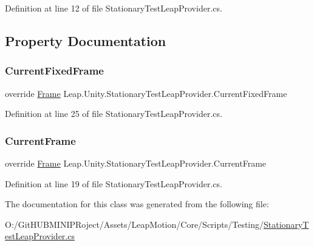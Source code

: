 Definition at line 12 of file Stationary\+Test\+Leap\+Provider.\+cs.



\subsection{Property Documentation}
\mbox{\label{class_leap_1_1_unity_1_1_stationary_test_leap_provider_ad14b3288247d8b694a35041f72789867}} 
\subsubsection{\texorpdfstring{CurrentFixedFrame}{CurrentFixedFrame}}
{\footnotesize\ttfamily override \mbox{\hyperlink{class_leap_1_1_frame}{Frame}} Leap.\+Unity.\+Stationary\+Test\+Leap\+Provider.\+Current\+Fixed\+Frame\hspace{0.3cm}{\ttfamily [get]}}



Definition at line 25 of file Stationary\+Test\+Leap\+Provider.\+cs.

\mbox{\label{class_leap_1_1_unity_1_1_stationary_test_leap_provider_aee23993f910db116ba13a0a06efb4bef}} 
\subsubsection{\texorpdfstring{CurrentFrame}{CurrentFrame}}
{\footnotesize\ttfamily override \mbox{\hyperlink{class_leap_1_1_frame}{Frame}} Leap.\+Unity.\+Stationary\+Test\+Leap\+Provider.\+Current\+Frame\hspace{0.3cm}{\ttfamily [get]}}



Definition at line 19 of file Stationary\+Test\+Leap\+Provider.\+cs.



The documentation for this class was generated from the following file\+:\begin{DoxyCompactItemize}
\item 
O\+:/\+Git\+H\+U\+B\+M\+I\+N\+I\+P\+Roject/\+Assets/\+Leap\+Motion/\+Core/\+Scripts/\+Testing/\mbox{\hyperlink{_stationary_test_leap_provider_8cs}{Stationary\+Test\+Leap\+Provider.\+cs}}\end{DoxyCompactItemize}
